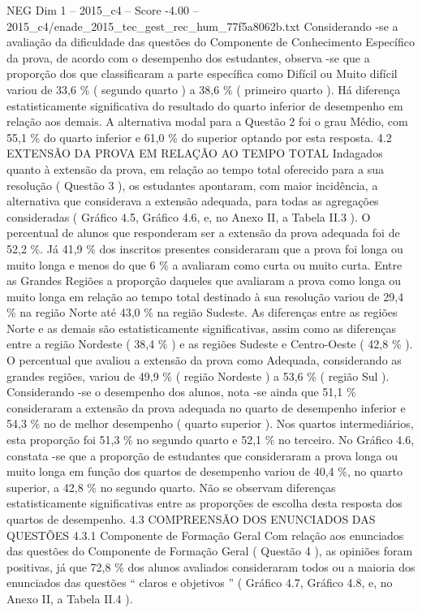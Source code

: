 \begin{textsample}{NEG Dim 1 – 2015\_c4 – Score -4.00 – 2015\_c4/enade\_2015\_tec\_gest\_rec\_hum\_77f5a8062b.txt}
Considerando -se a avaliação da dificuldade das questões do Componente de Conhecimento Específico da prova, de acordo com o desempenho dos estudantes, observa -se que a proporção dos que classificaram a parte específica como Difícil ou Muito difícil variou de 33,6 \% ( segundo quarto ) a 38,6 \% ( primeiro quarto ).
Há diferença estatisticamente significativa do resultado do quarto inferior de desempenho em relação aos demais.
A alternativa modal para a Questão 2 foi o grau Médio, com 55,1 \% do quarto inferior e 61,0 \% do superior optando por esta resposta. 4.2 EXTENSÃO DA PROVA EM RELAÇÃO AO TEMPO TOTAL Indagados quanto à extensão da prova, em relação ao tempo total oferecido para a sua resolução ( Questão 3 ), os estudantes apontaram, com maior incidência, a alternativa que considerava a extensão adequada, para todas as agregações consideradas ( Gráfico 4.5, Gráfico 4.6, e, no Anexo II, a Tabela II.3 ).
O percentual de alunos que responderam ser a extensão da prova adequada foi de 52,2 \%.
Já 41,9 \% dos inscritos presentes consideraram que a prova foi longa ou muito longa e menos do que 6 \% a avaliaram como curta ou muito curta.
Entre as Grandes Regiões a proporção daqueles que avaliaram a prova como longa ou muito longa em relação ao tempo total destinado à sua resolução variou de 29,4 \% na região Norte até 43,0 \% na região Sudeste.
As diferenças entre as regiões Norte e as demais são estatisticamente significativas, assim como as diferenças entre a região Nordeste ( 38,4 \% ) e as regiões Sudeste e Centro-Oeste ( 42,8 \% ).
O percentual que avaliou a extensão da prova como Adequada, considerando as grandes regiões, variou de 49,9 \% ( região Nordeste ) a 53,6 \% ( região Sul ).
Considerando -se o desempenho dos alunos, nota -se ainda que 51,1 \% consideraram a extensão da prova adequada no quarto de desempenho inferior e 54,3 \% no de melhor desempenho ( quarto superior ).
Nos quartos intermediários, esta proporção foi 51,3 \% no segundo quarto e 52,1 \% no terceiro.
No Gráfico 4.6, constata -se que a proporção de estudantes que consideraram a prova longa ou muito longa em função dos quartos de desempenho variou de 40,4 \%, no quarto superior, a 42,8 \% no segundo quarto.
Não se observam diferenças estatisticamente significativas entre as proporções de escolha desta resposta dos quartos de desempenho. 4.3 COMPREENSÃO DOS ENUNCIADOS DAS QUESTÕES 4.3.1 Componente de Formação Geral Com relação aos enunciados das questões do Componente de Formação Geral ( Questão 4 ), as opiniões foram positivas, já que 72,8 \% dos alunos avaliados consideraram todos ou a maioria dos enunciados das questões “ claros e objetivos ” ( Gráfico 4.7, Gráfico 4.8, e, no Anexo II, a Tabela II.4 ).

\end{textsample}
